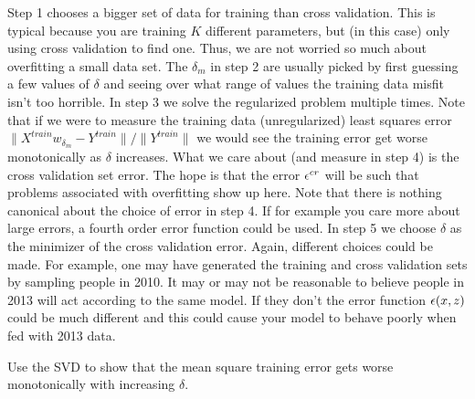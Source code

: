 Step 1 chooses a bigger set of data for training than cross validation.  This is typical because you are training $K$ different parameters, but (in this case) only using cross validation to find one.  Thus, we are not worried so much about overfitting a small data set.  The $\delta_m$ in step 2 are usually picked by first guessing a few values of $\delta$ and seeing over what range of values the training data misfit isn't too horrible.  In step 3 we solve the regularized problem multiple times.  Note that if we were to measure the training data (unregularized) least squares error $\|X^{train}w_{\delta_m}- Y^{train}\|/\|Y^{train}\|$ we would see the training error get worse monotonically as $\delta$ increases.  What we care about (and measure in step 4) is the cross validation set error.  The hope is that the error ${\epsilon}^{cr}$ will be such that problems associated with overfitting show up here.  Note that there is nothing canonical about the choice of error in step 4.  If for example you care more about large errors, a fourth order error function could be used.  In step 5 we choose $\delta$ as the minimizer of the cross validation error.  Again, different choices could be made.  For example, one may have generated the training and cross validation sets by sampling people in 2010.  It may or may not be reasonable to believe people in 2013 will act according to the same model.  If they don't the error function ${\epsilon}(x,z)$ could be much different and this could cause your model to behave poorly when fed with 2013 data.

\begin{exercise}
  Use the SVD to show that the mean square training error gets worse monotonically with increasing $\delta$.
\end{exercise}

